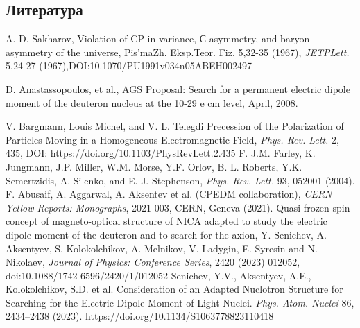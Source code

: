 \documentclass[final]{beamer}
\begin{document}
\begin{frame}[t]
\begin{multicols}{3}


\section{Литература}

\begin{thebibliography}{99}

 A. D. Sakharov, Violation of CP in variance, С asymmetry, and baryon asymmetry of the universe, Pis’maZh. Eksp.Teor. Fiz. 5,32-35 (1967), \textit{JETPLett.} 5,24-27 (1967),DOI:10.1070/PU1991v034n05ABEH002497

 D. Anastassopoulos, et al., AGS Proposal: Search for a permanent electric dipole moment of the deuteron nucleus at the 10-29 e cm level, April, 2008.

 V. Bargmann, Louis Michel, and V. L. Telegdi Precession of the Polarization of Particles Moving in a Homogeneous Electromagnetic Field, \textit{Phys. Rev. Lett.} 2, 435, DOI: https://doi.org/10.1103/PhysRevLett.2.435 
 F. J.M. Farley, K. Jungmann, J.P. Miller, W.M. Morse, Y.F. Orlov, B. L. Roberts, Y.K. Semertzidis, A. Silenko, and E. J. Stephenson, \textit{Phys. Rev. Lett.} 93, 052001 (2004). 
 F. Abusaif, A. Aggarwal, A. Aksentev et al. (CPEDM collaboration), \textit{CERN Yellow Reports: Monographs}, 2021-003, CERN, Geneva (2021).
 Quasi-frozen spin concept of magneto-optical structure of NICA adapted to study the electric dipole moment of the deuteron and to search for the axion, Y. Senichev, A. Aksentyev, S. Kolokolchikov, A. Melnikov, V. Ladygin, E. Syresin and N. Nikolaev, \textit{Journal of Physics: Conference Series}, 2420 (2023) 012052, doi:10.1088/1742-6596/2420/1/012052
 Senichev, Y.V., Aksentyev, A.E., Kolokolchikov, S.D. et al. Consideration of an Adapted Nuclotron Structure for Searching for the Electric Dipole Moment of Light Nuclei. \textit{Phys. Atom. Nuclei} 86, 2434–2438 (2023). https://doi.org/10.1134/S1063778823110418

\end{thebibliography}

\end{multicols}

\end{frame}
\end{document}
